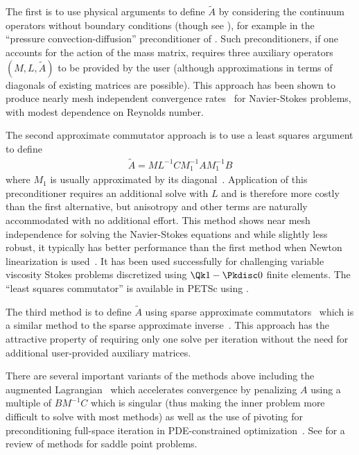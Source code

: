 The first is to use physical arguments to define $\tilde A$ by considering the continuum operators without boundary conditions (though see \cite{elman2009boundary}), for example in the ``pressure convection-diffusion'' preconditioner of \cite{silvester2001efficient,kay2002pss}.
Such preconditioners, if one accounts for the action of the mass matrix, requires three auxiliary operators $(M,L,\tilde A)$ to be provided by the user (although approximations in terms of diagonals of existing matrices are possible).
This approach has been shown to produce nearly mesh independent convergence rates~\cite{elman2005psm,deniet2007tps,elman2008tcp} for Navier-Stokes problems, with modest dependence on Reynolds number.

The second approximate commutator approach is to use a least squares argument to define
\begin{align*}
  \tilde A = M L^{-1} C M_1^{-1} A M_1^{-1} B
\end{align*}
where $M_1$ is usually approximated by its diagonal~\cite{elman1999bfbt,elman2006bpb}.
Application of this preconditioner requires an additional solve with $L$ and is therefore more costly than the first alternative, but anisotropy and other terms are naturally accommodated with no additional effort.
This method shows near mesh independence for solving the Navier-Stokes equations and while slightly less robust, it typically has better performance than the first method when Newton linearization is used~\cite{elman2008tcp}.
It has been used successfully for challenging variable viscosity Stokes problems discretized using $\Qk 1-\Pkdisc 0$ finite elements.
The ``least squares commutator'' is available in PETSc using .

The third method is to define $\tilde A$ using sparse approximate commutators~\cite{elman2006bpb} which is a similar method to the sparse approximate inverse~\cite{grote1997parallel}.
This approach has the attractive property of requiring only one solve per iteration without the need for additional user-provided auxiliary matrices.

There are several important variants of the methods above including the augmented Lagrangian~\cite{awanou2005convergence,dohrmann2006pbp,deniet2007tps} which accelerates convergence by penalizing $A$ using a multiple of $B M^{-1} C$ which is singular (thus making the inner problem more difficult to solve with most methods) as well as the use of pivoting for preconditioning full-space iteration in PDE-constrained optimization~\cite{biros2005pln1,biros2005pln2,akcelik2006parallel}.
See \cite{benzi2005nss} for a review of methods for saddle point problems.

